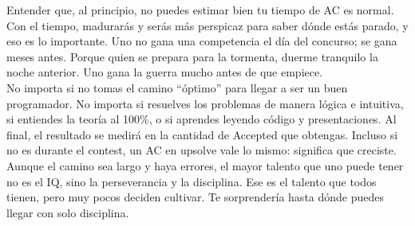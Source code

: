 Entender que, al principio, no puedes estimar bien tu tiempo de AC es normal. Con el tiempo, madurarás y serás más perspicaz para saber dónde estás parado, y eso es lo importante. Uno no gana una competencia el día del concurso; se gana meses antes. Porque quien se prepara para la tormenta, duerme tranquilo la noche anterior. Uno gana la guerra mucho antes de que empiece.\\

No importa si no tomas el camino “óptimo” para llegar a ser un buen programador. No importa si resuelves los problemas de manera lógica e intuitiva, si entiendes la teoría al 100\%, o si aprendes leyendo código y presentaciones. Al final, el resultado se medirá en la cantidad de Accepted que obtengas. Incluso si no es durante el contest, un AC en upsolve vale lo mismo: significa que creciste.\\

Aunque el camino sea largo y haya errores, el mayor talento que uno puede tener no es el IQ, sino la perseverancia y la disciplina. Ese es el talento que todos tienen, pero muy pocos deciden cultivar. Te sorprendería hasta dónde puedes llegar con solo disciplina.
\vspace{0.5cm} %

